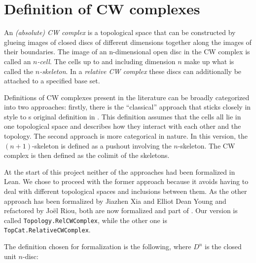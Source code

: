\section{Definition of CW complexes}

An \emph{(absolute) CW complex} is a topological space that can be constructed by glueing images of closed discs of different dimensions together along the images of their boundaries. 
The image of an n-dimensional open disc in the CW complex is called an \emph{$n$-cell}.
The cells up to and including dimension $n$ make up what is called the \emph{$n$-skeleton}.
In a \emph{relative CW complex} these discs can additionally be attached to a specified base set. 

Definitions of CW complexes present in the literature can be broadly categorized into two approaches: firstly, there is the ``classical'' approach that sticks closely in style to \citeauthor{Whitehead2018}s original definition in \cite{Whitehead2018}.
This definition assumes that the cells all lie in one topological space and describes how they interact with each other and the topology.
The second approach is more categorical in nature. 
In this version, the $(n + 1)$-skeleton is defined as a pushout involving the $n$-skeleton. 
The CW complex is then defined as the colimit of the skeletons. 

At the start of this project neither of the approaches had been formalized in Lean. 
We chose to proceed with the former approach because it avoids having to deal with different topological spaces and inclusions between them. 
As the other approach has been formalized by Jiazhen Xia and Elliot Dean Young and refactored by Joël Riou, both are now formalized and part of \mathlib. 
Our version is called \lstinline|Topology.RelCWComplex|, while the other one is \lstinline|TopCat.RelativeCWComplex|.

The definition chosen for formalization is the following, where $D^n$ is the closed unit $n$-disc:

